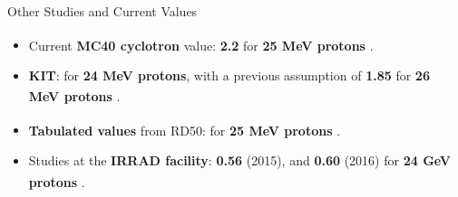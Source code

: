 \documentclass{beamer}
\begin{document}
\begin{frame}{Other Studies and Current Values}
\begin{itemize}
    \item Current \textbf{MC40 cyclotron} value: \textbf{2.2} for \textbf{25 MeV protons} \textsuperscript{\cite{krakow}}.
    \vspace{0.5cm}
    \item \textbf{KIT}:  for \textbf{24 MeV protons}, with a previous assumption of \textbf{1.85} for \textbf{26 MeV protons} \textsuperscript{\cite{Karlsruhe}}.
    \vspace{0.5cm}
    \item \textbf{Tabulated values} from RD50:  for \textbf{25 MeV protons} \textsuperscript{\cite{RD50}}.
    \vspace{0.5cm}
    \item Studies at the \textbf{IRRAD facility}: \textbf{0.56} (2015), and \textbf{0.60} (2016) for \textbf{24 GeV protons} \textsuperscript{\cite{IRRAD}}. 
\end{itemize}
    
\end{frame}
\end{document}
